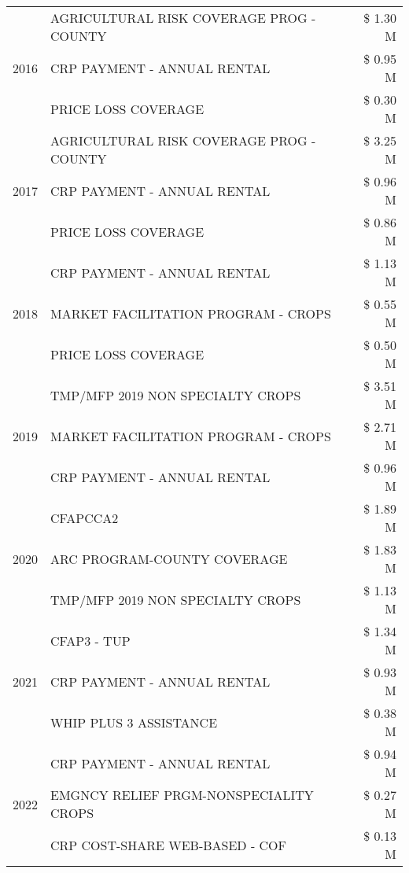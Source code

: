 \begin{tabular}{llr}
\cline{1-3}
\multirow[t]{3}{*}{2016} & AGRICULTURAL RISK COVERAGE PROG - COUNTY & \$ 1.30 M \\
 & CRP PAYMENT - ANNUAL RENTAL & \$ 0.95 M \\
 & PRICE LOSS COVERAGE & \$ 0.30 M \\
\cline{1-3}
\multirow[t]{3}{*}{2017} & AGRICULTURAL RISK COVERAGE PROG - COUNTY & \$ 3.25 M \\
 & CRP PAYMENT - ANNUAL RENTAL & \$ 0.96 M \\
 & PRICE LOSS COVERAGE & \$ 0.86 M \\
\cline{1-3}
\multirow[t]{3}{*}{2018} & CRP PAYMENT - ANNUAL RENTAL & \$ 1.13 M \\
 & MARKET FACILITATION PROGRAM - CROPS & \$ 0.55 M \\
 & PRICE LOSS COVERAGE & \$ 0.50 M \\
\cline{1-3}
\multirow[t]{3}{*}{2019} & TMP/MFP 2019 NON SPECIALTY CROPS & \$ 3.51 M \\
 & MARKET FACILITATION PROGRAM - CROPS & \$ 2.71 M \\
 & CRP PAYMENT - ANNUAL RENTAL & \$ 0.96 M \\
\cline{1-3}
\multirow[t]{3}{*}{2020} & CFAPCCA2 & \$ 1.89 M \\
 & ARC PROGRAM-COUNTY COVERAGE & \$ 1.83 M \\
 & TMP/MFP 2019 NON SPECIALTY CROPS & \$ 1.13 M \\
\cline{1-3}
\multirow[t]{3}{*}{2021} & CFAP3 - TUP & \$ 1.34 M \\
 & CRP PAYMENT - ANNUAL RENTAL & \$ 0.93 M \\
 & WHIP PLUS 3 ASSISTANCE & \$ 0.38 M \\
\cline{1-3}
\multirow[t]{3}{*}{2022} & CRP PAYMENT - ANNUAL RENTAL & \$ 0.94 M \\
 & EMGNCY RELIEF PRGM-NONSPECIALITY CROPS & \$ 0.27 M \\
 & CRP COST-SHARE WEB-BASED - COF & \$ 0.13 M \\
\cline{1-3}
\bottomrule
\end{tabular}
